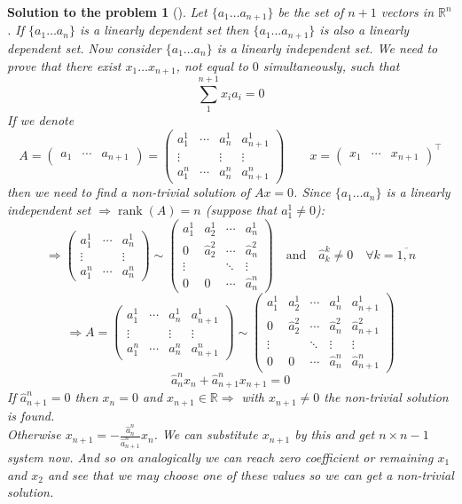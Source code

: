 \documentclass[12pt,a4]{article}
\newtheorem{solution}{Solution to the problem}
\newcommand\rank{\operatorname{rank}}
\begin{document}
\begin{solution}[]\rm Let $\{a_1 \dots a_{n+1}\}$ be the set of $n+1$ vectors in $\mathbb{R}^n$. If $\{a_1 \dots a_{n}\}$ is a linearly dependent set then $\{a_1 \dots a_{n+1}\}$ is also a linearly dependent set. Now consider $\{a_1 \dots a_{n}\}$ is a linearly independent set. We need to prove that there exist $x_1 \dots x_{n+1}$, not equal to $0$ simultaneously, such that
\[
\sum_1^{n+1}x_i a_i = 0
\]
If we denote
\[
A =
\begin{pmatrix} a_1 & \cdots & a_{n+1} \end{pmatrix} =
\begin{pmatrix}
a^1_1 & \cdots & a^1_n & a^1_{n+1} \\
\vdots & & \vdots & \vdots \\
a^n_1 & \cdots & a^n_n & a^n_{n+1}
\end{pmatrix} 
\qquad
x = \begin{pmatrix} x_1 & \cdots & x_{n+1} \end{pmatrix}^\top
\]
then we need to find a non-trivial solution of $Ax = 0$.
Since $\{a_1 \dots a_{n}\}$ is a linearly independent set $\Rightarrow \rank(A) = n$ (suppose that $a^1_1 \neq 0$):
\[
\Rightarrow
\begin{pmatrix}
a^1_1 & \cdots & a^1_{n} \\
\vdots & & \vdots \\
a^n_1 & \cdots & a^n_{n}
\end{pmatrix} 
\sim
\begin{pmatrix}
a^1_1 & a^1_2 & \cdots & a^1_n \\
0 & \hat a^2_2 & \cdots & \hat a^2_n \\
\vdots &  & \ddots & \vdots \\
0 & 0 & \cdots & \hat a^n_n
\end{pmatrix} \quad \text{and} \quad \hat a^k_k \neq 0 \quad \forall k=\overline{1,n}
\]
\[
\Rightarrow
A = \begin{pmatrix}
a^1_1 & \cdots & a^1_{n} & a^1_{n+1} \\
\vdots & & \vdots & \vdots \\
a^n_1 & \cdots & a^n_{n} & a^n_{n+1}
\end{pmatrix} 
\sim
\begin{pmatrix}
a^1_1 & a^1_2 & \cdots & a^1_n & a^1_{n+1} \\
0 & \hat a^2_2 & \cdots & \hat a^2_n & \hat a^2_{n+1} \\
\vdots &  & \ddots & \vdots & \vdots \\
0 & 0 & \cdots & \hat a^n_n & \hat a^n_{n+1}
\end{pmatrix}
\]
\[
\hat a^n_n x_n + \hat a^n_{n+1} x_{n+1} = 0
\]
If $\hat a^n_{n+1} = 0$ then $x_n = 0$ and $x_{n+1} \in \mathbb{R} \Rightarrow$ with $x_{n+1} \neq 0$ the non-trivial solution is found.\\
Otherwise $x_{n+1} = - \frac{\hat a^n_n}{\hat a^n_{n+1}} x_n $. We can substitute $x_{n+1}$ by this and get $n \times n-1$ system now. And so on analogically we can reach zero coefficient or remaining $x_1$ and $x_2$ and see that we may choose one of these values so we can get a non-trivial solution.
\\\end{solution}
\end{document}
